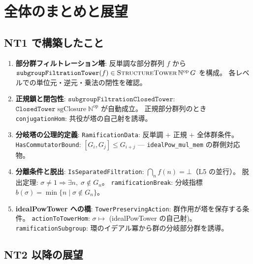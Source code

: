 \documentclass[a4paper,11pt]{ltjsarticle}
\theoremstyle{definition}
\theoremstyle{plain}
\theoremstyle{remark}
\newcommand{\sgcl}{\mathrm{sgClosure}}
\begin{document}
\section{全体のまとめと展望}

\subsection{NT1 で構築したこと}

\begin{enumerate}[label=\S NT1-\arabic*.]
  \item \textbf{部分群フィルトレーション塔}:
    反単調な部分群列 $f$ から $\texttt{subgroupFiltrationTower}(f)
    \in \textsc{StructureTower}\,\mathbb{N}^{\mathrm{op}}\,G$ を構成。
    各レベルでの単位元・逆元・乗法の閉性を確認。

  \item \textbf{正規鎖と閉包性}:
    $\texttt{subgroupFiltrationClosedTower}$:
    $\texttt{ClosedTower}\;\sgcl\;\mathbb{N}^{\mathrm{op}}$ が自動成立。
    正規部分群列のとき \texttt{conjugationHom}: 共役が塔の自己射を誘導。

  \item \textbf{分岐塔の公理的定義}:
    \texttt{RamificationData}: 反単調 + 正規 + 全体群条件。
    \texttt{HasCommutatorBound}: $[G_i,G_j] \leq G_{i+j}$
    — \texttt{idealPow\_mul\_mem} の群側対応物。

  \item \textbf{分離条件と脱出}:
    \texttt{IsSeparatedFiltration}: $\bigcap_n f(n) = \bot$（L5 の並行）。
    脱出定理: $\sigma \neq 1 \Rightarrow \exists n,\;\sigma \notin G_n$。
    \texttt{ramificationBreak}: 分岐指標 $b(\sigma) = \min\{n \mid \sigma \notin G_n\}$。

  \item \textbf{idealPowTower への橋}:
    \texttt{TowerPreservingAction}: 群作用が塔を保存する条件。
    \texttt{actionToTowerHom}: $\sigma \mapsto$ (idealPowTower の自己射)。
    \texttt{ramificationSubgroup}: 環のイデアル冪から群の分岐部分群を誘導。
\end{enumerate}

\subsection{NT2 以降の展望}
\end{document}
